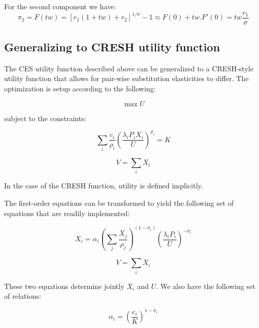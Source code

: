 \noindent For the second component we have:
\begin{displaymath}
\pi_2=F(tw) = \left[ r_1\left({1+\mathit{tw}}\right)+{r_2} \right]^{1/\sigma}-1 \approx F(0) + tw.F'(0)=tw\frac{r_1}{\sigma}
\end{displaymath}

\ifCESDetail

\subsection{Generalizing to CRESH utility function}

The CES utility function described above can be generalized to a CRESH-style utility
function that allows for pair-wise substitution elasticities to differ.
The optimization is setup according to the following:

\begin{displaymath}
\max U
\end{displaymath}

\noindent subject to the constraints:

\begin{displaymath}
\sum_i{\frac{c_i}{\rho_i} \left( \frac{\lambda_i P_i X_i}{U}\right)^{\rho_i}} = K
\end{displaymath}

\begin{displaymath}
V=\sum\limits_{i} {X_i}
\end{displaymath}

\noindent In the case of the CRESH function, utility is defined implicitly.

The first-order equations can be transformed to yield the following set of
equations that are readily implemented:

\begin{equation}
\label{eq:CRESHAllocX}
X_i = \alpha_i \left(\sum_j{\frac{X_j}{\rho_j}} \right)^{(1-\sigma_i)}
\left( \frac{\lambda_i P_i}{U}\right)^{-\sigma_i}
\end{equation}

\begin{equation}
\label{eq:CRESHAllocU}
V = \sum_i {X_i}
\end{equation}

\noindent These two equations determine jointly $X_i$ and $U$. We also have the following
set of relations:

\begin{displaymath}
\alpha_i = \left( \frac{c_i}{K} \right)^{1-\sigma_i}
\end{displaymath}

